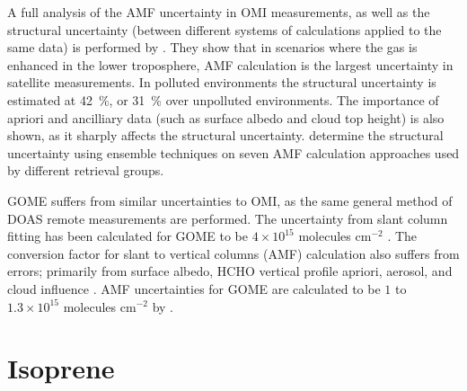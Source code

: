    A full analysis of the AMF uncertainty in OMI measurements, as well as the structural uncertainty (between different systems of calculations applied to the same data) is performed by \cite{Lorente2017}.
    They show that in scenarios where the gas is enhanced in the lower troposphere, AMF calculation is the largest uncertainty in satellite measurements.
    In polluted environments the structural uncertainty is estimated at 42~\%, or 31~\% over unpolluted environments.
    The importance of apriori and ancilliary data (such as surface albedo and cloud top height) is also shown, as it sharply affects the structural uncertainty.
    \cite{Lorente2017} determine the structural uncertainty using ensemble techniques on seven AMF calculation approaches used by different retrieval groups.
    
    GOME suffers from similar uncertainties to OMI, as the same general method of DOAS remote measurements are performed.
    The uncertainty from slant column fitting has been calculated for GOME to be $4\times10^{15}$ molecules cm$^{-2}$ \citep{Chance2000, Millet2006}. 
    The conversion factor for slant to vertical columns (AMF) calculation also suffers from errors; primarily from surface albedo, HCHO vertical profile apriori, aerosol, and cloud influence \citep{Millet2006}. 
    AMF uncertainties for GOME are calculated to be $1$ to $1.3\times10^{15}$ molecules cm$^{-2}$ by \citet{Shim2005}.
    
\section{Isoprene}
\label{ch_LitRev:sec:isoprene}

